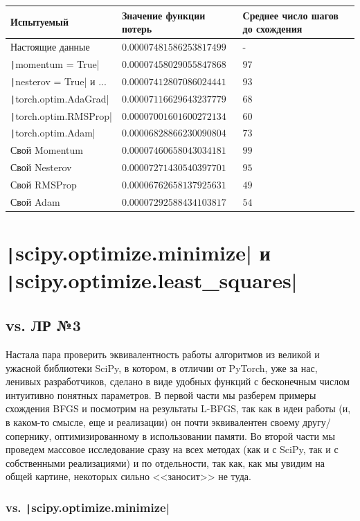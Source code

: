 \documentclass[12pt, a4paper, oneside, final]{article}
\begin{document}
	\begin{table}[H]
		\centering
		\begin{tabular}{l|l|l}
			Испытуемый & Значение функции потерь & Среднее число шагов до схождения \\ \hline
			Настоящие данные & $0.00007481586253817499$ & - \\
			\texttt|momentum = True| & $0.00007458029055847868$ & $97$ \\
			\texttt|nesterov = True| и ... & $0.00007412807086024441$ & $93$ \\
			\texttt|torch.optim.AdaGrad| & $0.00007116629643237779$ & $68$ \\
			\texttt|torch.optim.RMSProp| & $0.00007001601600272134$ & $60$ \\
			\texttt|torch.optim.Adam| & $0.00006828866230090804$ & $73$ \\
			Свой Momentum & $0.00007460658043034181$ & $99$ \\
			Свой Nesterov & $0.00007271430540397701$ & $95$ \\
			Свой RMSProp & $0.00006762658137925631$ & $49$ \\
			Свой Adam & $0.00007292588434103817$ & $54$
		\end{tabular}
	\end{table}
	\newpage
	\section*{\texttt|scipy.optimize.minimize| и \texttt|scipy.optimize.least_squares|}
	\subsection*{vs. ЛР №3}
	Настала пара проверить эквивалентность работы алгоритмов из великой и ужасной библиотеки SciPy, в котором, в отличии от PyTorch, уже за нас, ленивых разработчиков, сделано в виде удобных функций с бесконечным числом интуитивно понятных параметров.
	В первой части мы разберем примеры схождения BFGS и посмотрим на результаты L-BFGS, так как в идеи работы (и, в каком-то смысле, еще и реализации) он почти эквивалентен своему другу/сопернику, оптимизированному в использовании памяти.
	Во второй части мы проведем массовое исследование сразу на всех методах (как и с SciPy, так и с собственными реализациями) и по отдельности, так как, как мы увидим на общей картине, некоторых сильно <<заносит>> не туда.
	\subsubsection*{vs. \texttt|scipy.optimize.minimize|}
\end{document}
